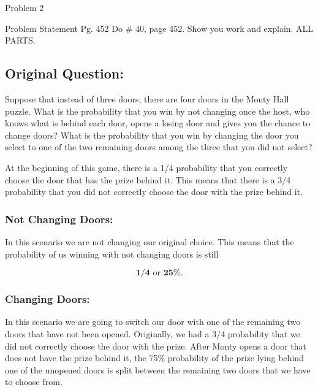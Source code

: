 \begin{problem}{Problem 2}
    \begin{statement}{Problem Statement}
        Pg. 452 Do \# 40, page 452. Show you work and explain. ALL PARTS.

        \subsection*{Original Question:}

        Suppose that instead of three doors, there are four doors in the Monty Hall puzzle. What is the probability that you win by not changing once the host, who knows what is behind each door, opens 
        a losing door and gives you the chance to change doors? What is the probability that you win by changing the door you select to one of the two remaining doors among the three that you did not select?
    \end{statement}

    \begin{highlight}[Solution]
        At the beginning of this game, there is a 1/4 probability that you correctly choose the door that has the prize behind it. This means that there is a 3/4 probability that you did not correctly choose
        the door with the prize behind it.

        \subsubsection*{Not Changing Doors:}

        In this scenario we are not changing our original choice. This means that the probability of us winning with not changing doors is still 
        
        \setcounter{equation}{0}
        \begin{equation}
            \mathbf{1/4} \text{ or } \mathbf{25\%}.
        \end{equation}

        \subsubsection*{Changing Doors:}

        In this scenario we are going to switch our door with one of the remaining two doors that have not been opened. Originally, we had a 3/4 probability that we did not correctly choose the door 
        with the prize. After Monty opens a door that does not have the prize behind it, the 75\% probability of the prize lying behind one of the unopened doors is split between the remaining two
        doors that we have to choose from.


\end{highlight}
\end{problem}
